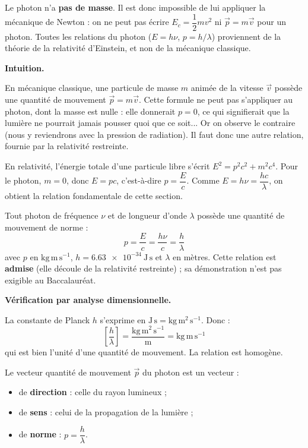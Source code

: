 \documentclass[11pt]{article}
\newcounter{popsec}
\newcounter{popsub}
\newcommand{\courssub}[1]{%
  \stepcounter{popsub}%
  \par\vspace{9pt}\noindent{\popxbold\fontsize{11.5}{13}\selectfont\color{popink}{\color{poporange}\thepopsec.\thepopsub}\hspace{6pt}#1}\par\nopagebreak\vspace{4pt}
}
\begin{document}
\begin{attention}
Le photon n'a \textbf{pas de masse}. Il est donc impossible de lui appliquer la mécanique de Newton : on ne peut pas écrire $E_c = \dfrac{1}{2}mv^2$ ni $\vec{p} = m\vec{v}$ pour un photon. Toutes les relations du photon ($E = h\nu$, $p = h/\lambda$) proviennent de la théorie de la relativité d'Einstein, et non de la mécanique classique.
\end{attention}

\courssub{Quantité de mouvement du photon : $p = \dfrac{h}{\lambda}$}

\textbf{Intuition.}\par
En mécanique classique, une particule de masse $m$ animée de la vitesse $\vec{v}$ possède une quantité de mouvement $\vec{p} = m\vec{v}$. Cette formule ne peut pas s'appliquer au photon, dont la masse est nulle : elle donnerait $p = 0$, ce qui signifierait que la lumière ne pourrait jamais pousser quoi que ce soit... Or on observe le contraire (nous y reviendrons avec la pression de radiation). Il faut donc une autre relation, fournie par la relativité restreinte.

En relativité, l'énergie totale d'une particule libre s'écrit $E^2 = p^2c^2 + m^2c^4$. Pour le photon, $m = 0$, donc $E = pc$, c'est-à-dire $p = \dfrac{E}{c}$. Comme $E = h\nu = \dfrac{hc}{\lambda}$, on obtient la relation fondamentale de cette section.

\begin{propriete}
Tout photon de fréquence $\nu$ et de longueur d'onde $\lambda$ possède une quantité de mouvement de norme :
\[
p = \frac{E}{c} = \frac{h\nu}{c} = \frac{h}{\lambda}
\]
avec $p$ en $\mathrm{kg\,m\,s^{-1}}$, $h = \num{6,63e-34}\ \mathrm{J\,s}$ et $\lambda$ en mètres.
Cette relation est \textbf{admise} (elle découle de la relativité restreinte) ; sa démonstration n'est pas exigible au Baccalauréat.
\end{propriete}

\textbf{Vérification par analyse dimensionnelle.}\par
La constante de Planck $h$ s'exprime en $\mathrm{J\,s} = \mathrm{kg\,m^2\,s^{-1}}$. Donc :
\[
\left[\frac{h}{\lambda}\right] = \frac{\mathrm{kg\,m^2\,s^{-1}}}{\mathrm{m}} = \mathrm{kg\,m\,s^{-1}}
\]
qui est bien l'unité d'une quantité de mouvement. La relation est homogène.

\begin{definition}
Le vecteur quantité de mouvement $\vec{p}$ du photon est un vecteur :
\begin{itemize}
\item de \textbf{direction} : celle du rayon lumineux ;
\item de \textbf{sens} : celui de la propagation de la lumière ;
\item de \textbf{norme} : $p = \dfrac{h}{\lambda}$.
\end{itemize}
\end{definition}
\end{document}
